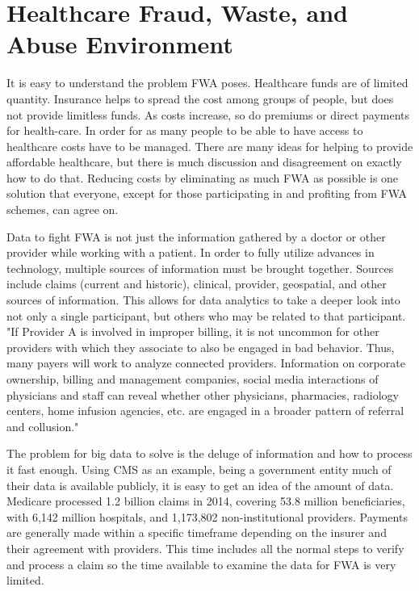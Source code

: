 \documentclass[sigconf]{acmart}
\begin{document}
\section{Healthcare Fraud, Waste, and Abuse Environment}

It is easy to understand the problem FWA poses.  Healthcare funds are of limited 
quantity.  Insurance helps to spread the cost among groups of people, but does not 
provide limitless funds.  As costs increase, so do premiums or direct payments for 
health-care.  In order for as many people to be able to have access to healthcare 
costs have to be managed.  There are many ideas for helping to provide affordable 
healthcare, but there is much discussion and disagreement on exactly how to do that.  
Reducing costs by eliminating as much FWA as possible is one solution that everyone, 
except for those participating in and profiting from FWA schemes, can agree on.

Data to fight FWA is not just the information gathered by a doctor or other provider 
while working with a patient.  In order to fully utilize advances in technology, 
multiple sources of information must be brought together.  Sources include claims 
(current and historic), clinical, provider, geospatial, and other sources of 
information.  This allows for data analytics to take a deeper look into not only a 
single participant, but others who may be related to that participant.  "If Provider 
A is involved in improper billing, it is not uncommon for other providers with which 
they associate to also be engaged in bad behavior.  Thus, many payers will work to 
analyze connected providers.  Information on corporate ownership, billing and 
management companies, social media interactions of physicians and staff can reveal 
whether other physicians, pharmacies, radiology centers, home infusion agencies, etc. 
are engaged in a broader pattern of referral and collusion."\cite{RevCycle}

The problem for big data to solve is the deluge of information and how to process it 
fast enough.  Using CMS as an example, being a government entity much of their data is 
available publicly, it is easy to get an idea of the amount of data.  Medicare processed 
1.2 billion claims in 2014, covering 53.8 million beneficiaries, with 6,142 million 
hospitals, and 1,173,802 non-institutional providers\cite{2015CMSStatistics}.  Payments 
are generally made within a specific timeframe depending on the insurer and their 
agreement with providers.  This time includes all the normal steps to verify and process 
a claim so the time available to examine the data for FWA is very limited.
\end{document}
